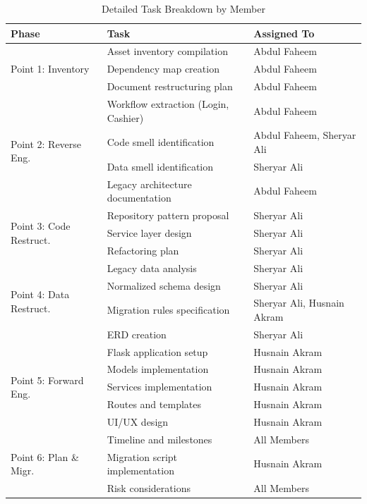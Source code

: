 \begin{table}[h]
  \centering
  \caption{Detailed Task Breakdown by Member}
  \begin{tabular}{p{3.5cm} p{5cm} p{4.5cm}}
    \toprule
    \textbf{Phase} & \textbf{Task} & \textbf{Assigned To} \\
    \midrule
    \multirow{3}{*}{Point 1: Inventory} &
      Asset inventory compilation & Abdul Faheem \\
    & Dependency map creation & Abdul Faheem \\
    & Document restructuring plan & Abdul Faheem \\
    \midrule
    \multirow{4}{*}{Point 2: Reverse Eng.} &
      Workflow extraction (Login, Cashier) & Abdul Faheem \\
    & Code smell identification & Abdul Faheem, Sheryar Ali \\
    & Data smell identification & Sheryar Ali \\
    & Legacy architecture documentation & Abdul Faheem \\
    \midrule
    \multirow{3}{*}{Point 3: Code Restruct.} &
      Repository pattern proposal & Sheryar Ali \\
    & Service layer design & Sheryar Ali \\
    & Refactoring plan & Sheryar Ali \\
    \midrule
    \multirow{4}{*}{Point 4: Data Restruct.} &
      Legacy data analysis & Sheryar Ali \\
    & Normalized schema design & Sheryar Ali \\
    & Migration rules specification & Sheryar Ali, Husnain Akram \\
    & ERD creation & Sheryar Ali \\
    \midrule
    \multirow{5}{*}{Point 5: Forward Eng.} &
      Flask application setup & Husnain Akram \\
    & Models implementation & Husnain Akram \\
    & Services implementation & Husnain Akram \\
    & Routes and templates & Husnain Akram \\
    & UI/UX design & Husnain Akram \\
    \midrule
    \multirow{3}{*}{Point 6: Plan \& Migr.} &
      Timeline and milestones & All Members \\
    & Migration script implementation & Husnain Akram \\
    & Risk considerations & All Members \\

\end{tabular}
\end{table}
